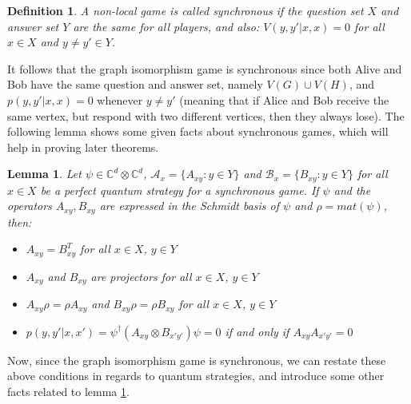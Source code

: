 \documentclass[12pt]{article}
\newtheorem{lem}[thm]{Lemma}
\newtheorem{defn}[thm]{Definition}
\begin{document}
\begin{defn}
  A non-local game is called synchronous if the question set $X$ and
  answer set $Y$ are the same for all players, and also: $V(y, y'|x,
  x) = 0$ for all $x \in X$ and $y \neq y' \in Y$.
\end{defn}

It follows that the graph isomorphism game is synchronous since both
Alive and Bob have the same question and answer set, namely $V(G) \cup
V(H)$, and $p(y, y'|x, x) = 0$ whenever $y \neq y'$ (meaning that if
Alice and Bob receive the same vertex, but respond with two different
vertices, then they always lose). The following lemma shows some given
facts about synchronous games, which will help in proving later
theorems.

\begin{lem}
  \label{synclem}
  Let $\psi \in \mathbb{C}^d \otimes \mathbb{C}^d$, $\mathcal{A}_x =
  \{A_{xy}: y \in Y\}$ and $\mathcal{B}_x = \{B_{xy}: y \in Y\}$ for
  all $x \in X$ be a perfect quantum strategy for a synchronous
  game. If $\psi$ and the operators $A_{xy}, B_{xy}$ are expressed in
  the Schmidt basis of $\psi$ and $\rho = mat(\psi)$, then:
  \begin{itemize}
  \item $A_{xy} = B_{xy}^T$ for all $x \in X$, $y \in Y$
  \item $A_{xy}$ and $B_{xy}$ are projectors for all $x \in X$, $y \in
    Y$
  \item $A_{xy} \rho = \rho A_{xy}$ and $B_{xy} \rho = \rho B_{xy}$
    for all $x \in X$, $y \in Y$
  \item $p(y, y'|x, x') = \psi^{\dag} (A_{xy} \otimes B_{x'y'}) \psi =
    0$ if and only if $A_{xy}A_{x'y'} = 0$
  \end{itemize}
\end{lem}

Now, since the graph isomorphism game is synchronous, we can restate
these above conditions in regards to quantum strategies, and introduce
some other facts related to lemma \ref{synclem}.
\end{document}
